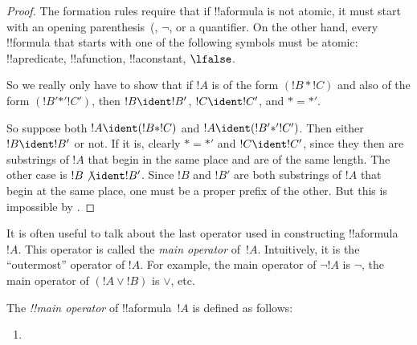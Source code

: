 \begin{proof}
The formation rules require that if !!a{formula} is not atomic, it
must start with an opening parenthesis~(, $\lnot$,
or a quantifier. On the other hand, every !!{formula} that starts with
one of the following symbols must be atomic: !!a{predicate}, !!a{function}, !!a{constant}, $\lfalse$.

So we really only have to show that if $!A$ is of the form $(!B \ast
!C)$ and also of the form $(!B' \mathbin{\ast'} !C')$, then $!B \ident
!B'$, $!C \ident !C'$, and $\ast = {\ast'}$.

So suppose both $!A \ident (!B \ast !C)$ and $!A \ident (!B'
\mathbin{\ast'} !C')$.  Then either $!B \ident !B'$ or not.  If it is,
clearly $\ast = {\ast'}$ and $!C \ident !C'$, since they then are
substrings of $!A$ that begin in the same place and are of the same
length.  The other case is $!B \not\ident !B'$.  Since $!B$ and
$!B'$ are both substrings of $!A$ that begin at the same place, one
must be a proper prefix of the other.  But this is impossible by
.
\end{proof}








\begin{explain}
It is often useful to talk about the last operator used in
constructing !!a{formula}~$!A$.  This operator is called the \emph{main
  operator} of~$!A$. Intuitively, it is the ``outermost'' operator
of $!A$. For example, the main operator of $\lnot !A$ is $\lnot$,
the main operator of $(!A \lor !B)$ is $\lor$, etc.
\end{explain}


\begin{defn}
The \emph{!!{main operator}} of !!a{formula}~$!A$ is
defined as follows:
\begin{enumerate}
\item {}








\end{enumerate}
\end{defn}

